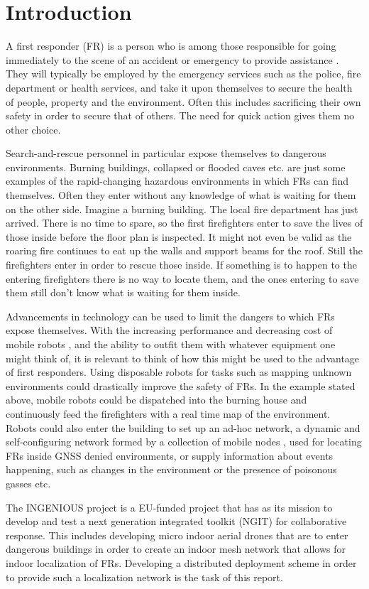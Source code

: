 \section{Introduction}

A first responder (FR) is a person who is among those responsible for going immediately to the scene of an accident or emergency to provide assistance \cite{FR}.
They will typically be employed by the emergency services such as the police, fire department or health services, and take it upon themselves to secure the health of people, property and the environment.
Often this includes sacrificing their own safety in order to secure that of others. The need for quick action gives them no other choice.

Search-and-rescue personnel in particular expose themselves to dangerous environments. Burning buildings, collapsed or flooded caves etc. are just some examples of the rapid-changing
hazardous environments in which FRs can find themselves. Often they enter without any knowledge of what is waiting for them on the other side. Imagine a burning building. The local fire department has just arrived. There is no time to 
spare, so the first firefighters enter to save the lives of those inside before the floor plan is inspected. It might not even be valid as the roaring fire continues to eat up the walls and support beams for the roof. Still the firefighters enter in order to rescue those inside.
If something is to happen to the entering firefighters there is no way to locate them, and the ones entering to save them still don't know what is waiting for them inside.

Advancements in technology can be used to limit the dangers to which FRs expose themselves. With the increasing performance and decreasing cost of mobile robots \cite{MAV_enabling}, and the ability to outfit them with whatever equipment one might think of, it is relevant to think of how 
this might be used to the advantage of first responders. Using disposable robots for tasks such as mapping unknown environments could drastically improve the safety of FRs. In the example stated above, mobile robots could be dispatched into the burning house
and continuously feed the firefighters with a real time map of the environment. Robots could also enter the building to set up an ad-hoc network, a dynamic and self-configuring network formed by a collection of mobile nodes \cite{GAVHALE2016477}, used for locating FRs inside GNSS denied environments, 
or supply information about events happening, such as changes in the environment or the presence of poisonous gasses etc.

The INGENIOUS project is a EU-funded project that has as its mission to develop and test a next generation integrated toolkit (NGIT) for collaborative response. This includes 
developing micro indoor aerial drones that are to enter dangerous buildings in order to create an indoor mesh network that allows for indoor localization of FRs.
Developing a distributed deployment scheme in order to provide such a localization network is the task of this report.